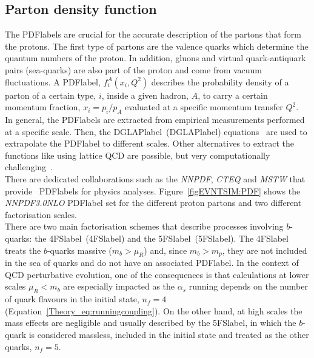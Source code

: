 \subsection{Parton density function}

The \acrshort{PDFlabel}s are crucial for the accurate description of the partons that form the protons. The first type of partons are the valence quarks which determine the quantum numbers of the proton. In addition, gluons and virtual quark-antiquark pairs (sea-quarks) are also part of the proton and come from vacuum fluctuations. A \acrshort{PDFlabel}, $f_i^A(x_i,Q^2)$ describes the probability density of a parton of a certain type, $i$, inside a given hadron, $A$, to carry a certain momentum fraction, $x_i=p_i/p_A$ evaluated at a specific momentum transfer $Q^2$.\\

In general, the \acrshort{PDFlabel}s are extracted from empirical measurements performed at a specific scale. Then, the \acrlong{DGLAPlabel}~(\acrshort{DGLAPlabel}) equations~\cite{DGLAP1,DGLAP2,DGLAP3} are used to extrapolate the \acrshort{PDFlabel} to different scales. Other alternatives to extract the functions like using lattice \acrshort{QCD} are possible, but very computationally challenging~\cite{Bhat_2021}.\\

There are dedicated collaborations such as the \textit{NNPDF}, \textit{CTEQ} and \textit{MSTW} that provide~\cite{Ball_2015,LesHouches,Martin_2009}
 \acrshort{PDFlabel}s for physics analyses. Figure~\ref{figEVNTSIM:PDF} shows the \textit{NNPDF3.0NLO} \acrshort{PDFlabel} set for the different proton partons and two different factorisation scales.\\

 There are two main factorisation schemes that describe processes involving $b$-quarks: the \acrlong{4FSlabel}~(\acrshort{4FSlabel}) and the \acrlong{5FSlabel}~(\acrshort{5FSlabel}). The \acrshort{4FSlabel} treats the $b$-quarks massive ($m_b>\mu_R$) and, since $m_b>m_p$, they are not included in the sea of quarks and do not have an associated \acrshort{PDFlabel}. In the context of \acrshort{QCD} perturbative evolution, one of the consequences is that calculations at lower scales $\mu_R<m_b$ are especially impacted as the $\alpha_s$ running depends on the number of quark flavours in the initial state, $n_f=4$ (Equation~\ref{Theory_eq:runningcoupling}). On the other hand, at high scales the mass effects are negligible and usually described by the \acrshort{5FSlabel}, in which the $b$-quark is considered massless, included in the initial state and treated as the other quarks, $n_f=5$. 

